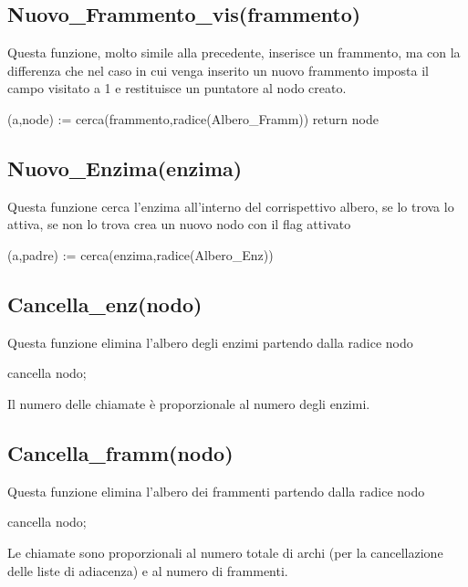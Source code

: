 \documentclass[a4paper,10pt]{article}
\begin{document}
\subsection{Nuovo\_{}Frammento\_{}vis(frammento)}
Questa funzione, molto simile alla precedente, inserisce un frammento, ma con la differenza che nel caso in cui venga inserito un nuovo frammento imposta il campo visitato a 1 e restituisce un puntatore al nodo creato.

\begin{algorithm}[H]
(a,node) := cerca(frammento,radice(Albero\_{}Framm))\;
return node\;
\end{algorithm}
\subsection{Nuovo\_{}Enzima(enzima)}
Questa funzione cerca l'enzima all'interno del corrispettivo albero, se lo trova lo attiva, se non lo trova crea un nuovo nodo con il flag attivato

\begin{algorithm}[H]
(a,padre) := cerca(enzima,radice(Albero\_{}Enz))\;
\end{algorithm}
\subsection{Cancella\_{}enz(nodo)}
Questa funzione elimina l'albero degli enzimi partendo dalla radice nodo

\begin{algorithm}[H]
cancella nodo;
\end{algorithm}
Il numero delle chiamate è proporzionale al numero degli enzimi.
\subsection{Cancella\_{}framm(nodo)}
Questa funzione elimina l'albero dei frammenti partendo dalla radice nodo

\begin{algorithm}[H]
cancella nodo;
\end{algorithm}
Le chiamate sono proporzionali al numero totale di archi (per la cancellazione delle liste di adiacenza) e al numero di frammenti.
\end{document}
